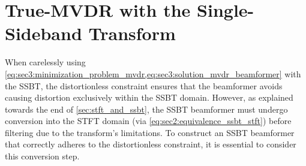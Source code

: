 \section{True-MVDR with the Single-Sideband Transform}
\label{sec:true_mvdr_ssbt}

When carelessly using \cref{eq:sec3:minimization_problem_mvdr,eq:sec3:solution_mvdr_beamformer} with the SSBT, the distortionless constraint ensures that the beamformer avoids causing distortion exclusively within the SSBT domain. However, as explained towards the end of \cref{sec:stft_and_ssbt}, the SSBT beamformer must undergo conversion into the STFT domain (via \cref{eq:sec2:equivalence_ssbt_stft}) before filtering due to the transform's limitations. To construct an SSBT beamformer that correctly adheres to the distortionless constraint, it is essential to consider this conversion step.

